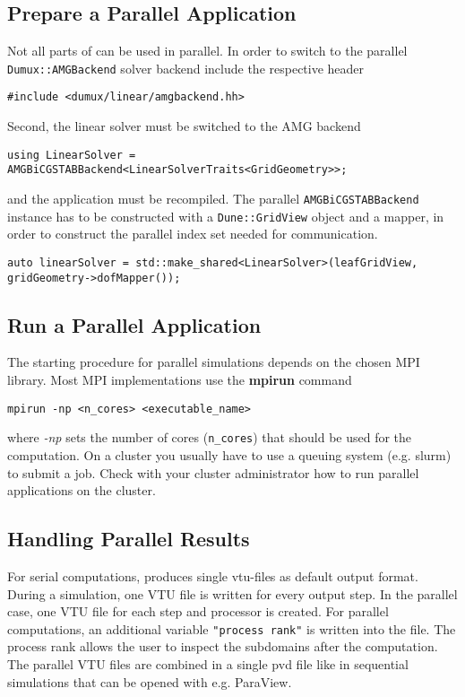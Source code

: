\subsection{Prepare a Parallel Application}
Not all parts of \Dumux can be used in parallel. In order to switch to the parallel \texttt{Dumux::AMGBackend}
solver backend include the respective header

\begin{lstlisting}[style=DumuxCode]
#include <dumux/linear/amgbackend.hh>
\end{lstlisting}

Second, the linear solver must be switched to the AMG backend

\begin{lstlisting}[style=DumuxCode]
using LinearSolver = AMGBiCGSTABBackend<LinearSolverTraits<GridGeometry>>;
\end{lstlisting}

and the application must be recompiled. The parallel \texttt{AMGBiCGSTABBackend} instance has to be
constructed with a \texttt{Dune::GridView} object and a mapper, in order to construct the
parallel index set needed for communication.

\begin{lstlisting}[style=DumuxCode]
auto linearSolver = std::make_shared<LinearSolver>(leafGridView, gridGeometry->dofMapper());
\end{lstlisting}

\subsection{Run a Parallel Application}
The starting procedure for parallel simulations depends on the chosen MPI library.
Most MPI implementations use the \textbf{mpirun} command

\begin{lstlisting}[style=Bash]
mpirun -np <n_cores> <executable_name>
\end{lstlisting}

where \textit{-np} sets the number of cores (\texttt{n\_cores}) that should be used for the
computation. On a cluster you usually have to use a queuing system (e.g. slurm) to
submit a job. Check with your cluster administrator how to run parallel applications on the cluster.

\subsection{Handling Parallel Results}
For serial computations, \Dumux produces single vtu-files as default output format.
During a simulation, one VTU file is written for every output step.
In the parallel case, one VTU file for each step and processor is created.
For parallel computations, an additional variable \texttt{"process rank"} is written
into the file. The process rank allows the user to inspect the subdomains
after the computation. The parallel VTU files are combined in a single pvd file
like in sequential simulations that can be opened with e.g. ParaView.
